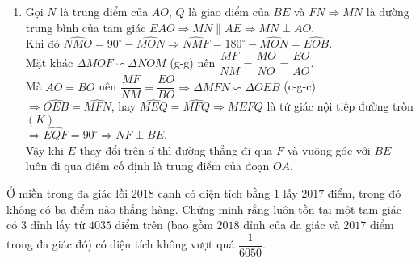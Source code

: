 \begin{ex}
{\begin{enumerate}
Lại có $ EC $, $ EA $ là các tiếp tuyến của đường tròn $ (O) $ nên $ \widehat{AOE}=\widehat{EOF} $.\\
Mặt khác $ FE\perp d $, $ AB\perp d $ nên $ FE\parallel AB\Rightarrow \widehat{AOE}=\widehat{OEF}\Rightarrow \widehat{OEF}=\widehat{EOF}\Rightarrow $ tam giác $ FOE $ cân tại $ F $.\\
Mà $ M $ là trung điểm của $ EO $ nên $ FM\perp EO\Rightarrow \widehat{FME}=90^{\circ}\Rightarrow M \in (K) $.
\item Gọi $ N $ là trung điểm của $ AO $, $ Q $ là giao điểm của $ BE $ và $ FN \Rightarrow MN$ là đường trung bình của tam giác $ EAO\Rightarrow MN\parallel AE\Rightarrow MN\perp AO$.\\
Khi đó $\widehat{NMO}=90^{\circ}-\widehat{MON}\Rightarrow \widehat{NMF}=180^{\circ}-\widehat{MON}=\widehat{EOB} $.\\
Mặt khác $ \Delta MOF\backsim \Delta NOM $ (g-g) nên $ \dfrac{MF}{NM}=\dfrac{MO}{NO}=\dfrac{EO}{AO} $.\\
Mà $ AO=BO $ nên $ \dfrac{MF}{NM}=\dfrac{EO}{BO}\Rightarrow \Delta MFN\backsim\Delta OEB $ (c-g-c)\\
$ \Rightarrow \widehat{OEB}=\widehat{MFN} $, hay $ \widehat{MEQ}=\widehat{MFQ}\Rightarrow MEFQ $ là tứ giác nội tiếp đường tròn $ (K)$\\
$\Rightarrow \widehat{EQF}=90^{\circ}\Rightarrow NF\perp BE $.\\
Vậy khi $ E $ thay đổi trên $ d $ thì đường thẳng đi qua $ F $ và vuông góc với $ BE $ luôn đi qua điểm cố định là trung điểm của đoạn $ OA $.
\end{enumerate}
}
\end{ex}
\begin{ex}%
Ở miền trong đa giác lồi $ 2018 $ cạnh có diện tích bằng $ 1 $ lấy $ 2017 $ điểm, trong đó không có ba điểm nào thẳng hàng. Chứng minh rằng luôn tồn tại một tam giác có $ 3 $ đỉnh lấy từ $ 4035 $ điểm trên (bao gồm $ 2018 $ đỉnh của đa giác và $ 2017 $ điểm trong đa giác đó) có diện tích không vượt quá $ \dfrac{1}{6050} $.
\end{ex}

